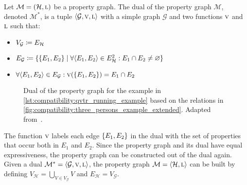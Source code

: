 \begin{definition}
Let $\mathcal{M} = (\mathcal{H}, \textsc{l})$ be a property graph. The dual of the property graph $\mathcal{M}$, denoted $\mathcal{M^{*}}$, is a tuple $\langle \mathcal{G}, \textsc{v}, \textsc{l} \rangle$ with a simple graph $\mathcal{G}$ and two functions $\textsc{v}$ and $\textsc{l}$ such that:
    \begin{itemize}
        \item $V_{\mathcal{G}} \coloneqq E_{\mathcal{H}}$
        \item $E_{\mathcal{G}} \equalsperdefinition \setted{\setted{E_1, E_2} \mid \forall \tupled{E_1, E_2} \in E_{\mathcal{H}}^2 : E_1 \cap E_2 \neq \varnothing}$
        \item $\forall \tupled{E_1, E_2} \in E_{\mathcal{G}} : \function{v}(\setted{E_1, E_2}) = E_1 \cap E_2$
    \end{itemize}
\end{definition}

\begin{figure}
    \centering
    
    
    \caption[Dual of the property graph for the running example]{Dual of the property graph for the \qvtr example in \autoref{lst:compatibility:qvtr_running_example} based on the relations in \autoref{fig:compatibility:three_persons_example_extended}. Adapted from~.}
    \label{fig:compatibility:dual_propertygraph_example}
\end{figure}

The function $\textsc{v}$ labels each edge $\{ E_1, E_2 \}$ in the dual with the set of properties that occur both in $E_1$ and $E_2$.
Since the property graph and its dual have equal expressiveness, the property graph can be constructed out of the dual again.
Given a dual $\mathcal{M^{*}} = \langle \mathcal{G}, \textsc{v}, \textsc{l} \rangle$, the property graph $\mathcal{M} = \langle \mathcal{H}, \textsc{l} \rangle$ can be built by defining $V_{\mathcal{H}} = \bigcup_{V \in V_{\mathcal{G}}} V$ and $E_{\mathcal{H}} = V_{\mathcal{G}}$. 


